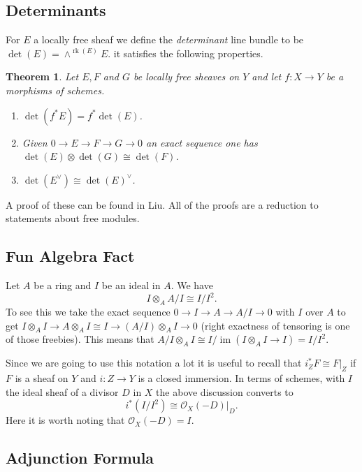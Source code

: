 \documentclass[12pt]{article}
\numberwithin{equation}{section}
\newtheorem{theorem}{Theorem}[subsection]
\theoremstyle{definition}
\theoremstyle{remark}
\newcommand{\Ocal}{\mathcal{O}}
\newcommand{\im}{\operatorname{im}}
\newcommand{\rk}{\operatorname{rk}}
\begin{document}
\subsection{Determinants}
For $E$ a locally free sheaf we define the \emph{determinant} line bundle to be $ \det(E) = \wedge^{\rk(E)} E.$
it satisfies the following properties. 
\begin{theorem}
	Let $E,F$ and $G$ be locally free sheaves on $Y$ and let $f:X\to Y$ be a morphisms of schemes.
	\begin{enumerate}
		\item $\det(f^*E) = f^*\det(E)$.
		\item Given $0 \to E \to F \to G \to 0$ an exact sequence one has $\det(E)\otimes \det(G) \cong \det(F)$.
		\item $\det(E^{\vee}) \cong \det(E)^{\vee}$.
	\end{enumerate}
\end{theorem}
A proof of these can be found in Liu. 
All of the proofs are a reduction to statements about free modules. 


\subsection{Fun Algebra Fact}
Let $A$ be a ring and $I$ be an ideal in $A$. 
We have 
$$I \otimes_A A/I \cong I/I^2.$$
To see this we take the exact sequence $0 \to I \to A \to A/I \to 0$ with $I$ over $A$ to get $I \otimes_A I \to A \otimes_A I \cong I \to (A/I)\otimes_A I \to 0$ (right exactness of tensoring is one of those freebies). 
This means that $A/I\otimes_A I \cong I/\im(I\otimes_A I\to I) = I/I^2$.

Since we are going to use this notation a lot it is useful to recall that $i_Z^* F\cong F\vert_Z$ if $F$ is a sheaf on $Y$ and $i:Z\to Y$ is a closed immersion. 
In terms of schemes, with $I$ the ideal sheaf of a divisor $D$ in $X$ the above discussion converts to 
 $$ i^*(I/I^2) \cong \Ocal_X(-D)\vert_D. $$
Here it is worth noting that $\Ocal_X(-D) = I$.

\subsection{Adjunction Formula}
\end{document}
